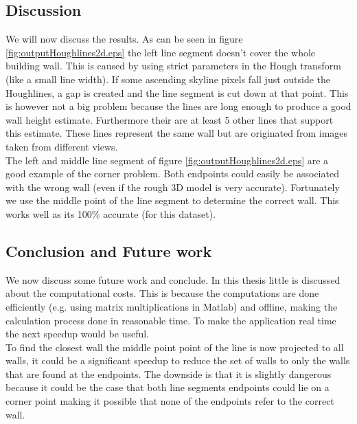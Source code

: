 \documentclass[10pt]{article}
\begin{document}

\subsection{Discussion}
We will now discuss the results. As can be seen in figure \ref{fig:outputHoughlines2d.eps} the left line segment doesn't cover the whole building wall. This is caused by using strict parameters in the Hough transform (like a small line width).
If some ascending skyline pixels fall just outside the Houghlines, a gap is created and the line segment is cut down at that point. This is however not a big problem because the lines are long enough to produce a good wall height estimate. Furthermore their are at least 5 other lines that support this estimate. These lines represent the same wall but are originated from images taken from different views. \\
The left and middle line segment of figure \ref{fig:outputHoughlines2d.eps} are a good example of the corner problem. Both endpoints could easily be associated with the wrong wall (even if the rough 3D model is very accurate). Fortunately we use the middle point of the line segment to determine the correct wall. This works well as its 100\% accurate (for this dataset).


\subsection{Conclusion and Future work}
We now discuss some future work and conclude.  In this thesis little is discussed about the computational costs. This is because the computations are done efficiently (e.g. using matrix multiplications in Matlab) and offline, making the calculation process done in reasonable time. To make the application real time the next speedup would be useful.\\
To find the closest wall the middle point point of the line is now projected to all walls, it could be a significant speedup to reduce the set of walls to only the walls that are found at the endpoints. The downside is that it is slightly dangerous because it could be the case that both line segments endpoints could lie on a corner point making it possible that none of the endpoints refer to the correct wall.\\
\end{document}
